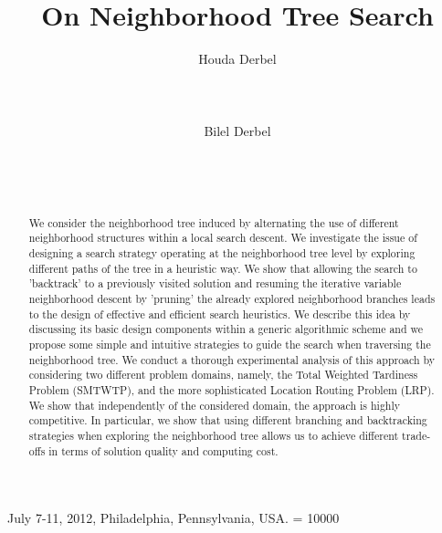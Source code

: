 \documentclass{acm_proc_article-sp}
\begin{document}
 {July 7-11, 2012, Philadelphia, Pennsylvania, USA.}
    \widowpenalty = 10000
    
\title{On Neighborhood Tree Search}
 \author{
\alignauthor
Houda Derbel\\
       \\
       \\
       \\
\alignauthor
Bilel Derbel\\
       \\
       \\
       \\
}

\date{}

\maketitle
\begin{abstract}
We consider the neighborhood tree induced by alternating the use of different neighborhood structures within a local search descent. We investigate the issue of designing a search strategy operating at the neighborhood tree level by exploring different paths of the tree in a heuristic way. We show that allowing the search to 'backtrack' to a previously visited solution and resuming the iterative variable neighborhood descent by 'pruning' the already explored neighborhood branches leads to the design of effective and efficient search heuristics. We describe this idea by discussing its basic design components within a generic algorithmic scheme and we propose some simple and intuitive strategies to guide the search when traversing the neighborhood tree. We conduct a thorough experimental analysis of this approach by considering two different problem domains, namely, the Total Weighted Tardiness Problem (SMTWTP), and the more sophisticated Location Routing Problem (LRP). We show that  independently of the considered domain, the approach is highly competitive. In particular, we show that using different branching and backtracking strategies when exploring the neighborhood tree allows us to achieve different trade-offs in terms of solution quality and computing cost.
\end{abstract}
\end{document}
